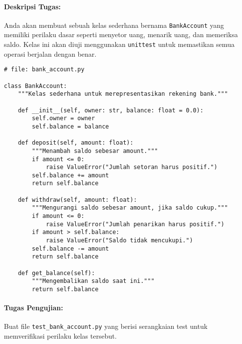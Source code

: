 \paragraph{Deskripsi Tugas:}

Anda akan membuat sebuah kelas sederhana bernama \texttt{BankAccount} yang memiliki perilaku dasar seperti menyetor uang, menarik uang, dan memeriksa saldo.  
Kelas ini akan diuji menggunakan \texttt{unittest} untuk memastikan semua operasi berjalan dengan benar.

\begin{lstlisting}[style=PythonStyle, caption={Kelas BankAccount yang memiliki state internal}, label={lst:bankaccount}]
# file: bank_account.py

class BankAccount:
    """Kelas sederhana untuk merepresentasikan rekening bank."""

    def __init__(self, owner: str, balance: float = 0.0):
        self.owner = owner
        self.balance = balance

    def deposit(self, amount: float):
        """Menambah saldo sebesar amount."""
        if amount <= 0:
            raise ValueError("Jumlah setoran harus positif.")
        self.balance += amount
        return self.balance

    def withdraw(self, amount: float):
        """Mengurangi saldo sebesar amount, jika saldo cukup."""
        if amount <= 0:
            raise ValueError("Jumlah penarikan harus positif.")
        if amount > self.balance:
            raise ValueError("Saldo tidak mencukupi.")
        self.balance -= amount
        return self.balance

    def get_balance(self):
        """Mengembalikan saldo saat ini."""
        return self.balance
\end{lstlisting}

\paragraph{Tugas Pengujian:}

Buat file \texttt{test\_bank\_account.py} yang berisi serangkaian test untuk memverifikasi perilaku kelas tersebut.

